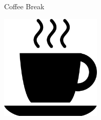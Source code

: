 \documentclass[a4paper]{article}
\begin{document}
\printGenericVSLHeader
\begin{center}
\begin{vsltext}{3cm}{3.2cm}

    Coffee Break

    \vspace{1cm}

    \includegraphics[height=5cm, keepaspectratio=true]{coffeecup.png}


\end{vsltext}

\end{center}
\end{document}

